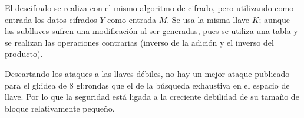 El descifrado se realiza con el mismo algoritmo de cifrado, pero
utilizando como entrada los datos cifrados $Y$ como entrada $M$. Se usa la
misma llave $K$; aunque las subllaves sufren una modificación al ser
generadas, pues se utiliza una tabla y se realizan las operaciones
contrarias (inverso de la adición y el inverso del producto).

Descartando los ataques a las llaves débiles, no hay un mejor ataque
publicado para el \gls{gl:idea} de 8 \glspl{gl:ronda} que el de la búsqueda
exhaustiva en el espacio de llave. Por lo que la seguridad está ligada a la
creciente debilidad de su tamaño de bloque relativamente pequeño.
